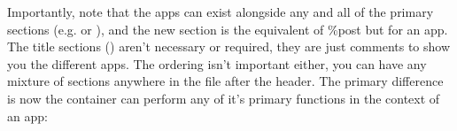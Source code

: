 \documentclass[letterpaper,10pt,english]{sphinxmanual}
\begin{document}
\begin{sphinxVerbatim}[commandchars=\\\{\}]
         


 








 

         


 


    


 

     


 


     
\end{sphinxVerbatim}

Importantly, note that the apps can exist alongside any and all of the
primary sections (e.g.  or  ), and the new  section is the equivalent of
\%post but for an app. The title sections (\sphinxcode{\sphinxupquote{\#\#\#\#\#\#}}) aren’t necessary or
required, they are just comments to show you the different apps. The
ordering isn’t important either, you can have any mixture of sections
anywhere in the file after the header. The primary difference is now
the container can perform any of it’s primary functions in the context
of an app:
\end{document}
